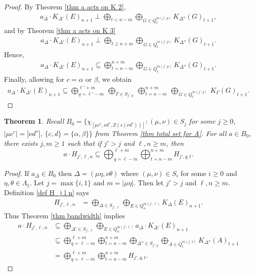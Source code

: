 \documentclass[12pt]{amsart}
\newcommand{\sse}{\subseteq}
\newcommand{\al}{\alpha}
\newcommand{\be}{\beta}
\newcommand{\Ga}{\Gamma}
\newcommand{\De}{\Delta}
\renewcommand{\th}{\theta}
\newcommand{\La}{\Lambda}
\theoremstyle{plain} %
\newtheorem{Theorem}{Theorem}[section]
\theoremstyle{definition} %
\begin{document}
\begin{proof}
    By Theorem \ref{thm a acts on K 2},
    \begin{align*}
        a_{\De} \cdot K_{\De'}(E)_{n+1} \perp \bigoplus_{t < n-m} \bigoplus_{G \in Q_{t}^{m(j',p)}} K_{\De''}(G)_{t+1},
    \end{align*}
    and by Theorem \ref{thm a acts on K 3}
    \begin{align*}
        a_{\De} \cdot K_{\De'}(E)_{n+1} \perp \bigoplus_{t \ge n+m} \bigoplus_{G \in Q_{t}^{m(j',p)}} K_{\De''}(G)_{t+1}.
    \end{align*}
    Hence,
    \begin{align*}
        a_{\De} \cdot K_{\De'}(E)_{n+1} \sse \bigoplus_{t = n-m}^{n+m} \bigoplus_{G \in Q_{t}^{m(j',p)}} K_{\De''}(G)_{t+1}.
    \end{align*}
    Finally, allowing for $c= \al$ or $\be$, we obtain
    \begin{align*}
        a_{\De} \cdot K_{\De'}(E)_{n+1} \sse \bigoplus_{q=\ell'-m}^{\ell'+m}\ \bigoplus_{\Ga \in S_{j',q}}\ \bigoplus_{t = n-m}^{n+m}\ \bigoplus_{G \in Q_{t}^{m(j',q)}}\ K_{\Ga}(G)_{t+1}.
    \end{align*}
\end{proof}



\begin{Theorem}\label{thm total bandwidth}
    Recall $B_0= \{\chi_{[\mu c^r, \nu d^s, Z(s(\nu d^s))]} : (\mu, \nu) \in S_j$ for some $j \ge 0$, $|\mu c^r| = |\nu d^s|, \ \{c, d\} = \{\al,\be\} \}$ from Theorem \ref{thm total set for A}. For all $a \in B_0$, there exists $j, m \ge 1$ such that if $j' > j$ and $\ell, n \ge m$, then
    \begin{equation*}
        a \cdot H_{j', \ell, n} \sse \bigoplus_{q = \ell-m}^{\ell+m} \bigoplus_{t =n-m}^{n+m} H_{j', q, t}.
    \end{equation*}
\end{Theorem}

\begin{proof}
    If $a_{\De} \in B_0$ then $\De = (\mu \eta, \nu \th)$ where $(\mu, \nu) \in S_i$ for some $i \ge 0$ and $\eta, \th \in \La_1$. Let $j = \max\{i, 1\}$ and $m = |\mu \eta|$. Then let $j' > j$ and $\ell, n \ge m$.
    Definition \ref{def H_j l n} says
    \begin{align*}
        H_{j', \ell, n} &= \bigoplus_{\De \in S_{j',\ell}} \bigoplus_{E \in Q_n^{m(j',\ell)}} K_{\De}(E)_{n+1}.
    \end{align*}
    Thus Theorem \ref{thm bandwidth} implies
    \begin{align*}
        a \cdot H_{j',\ell,n} &\sse \bigoplus_{\De' \in S_{j',\ell}} \bigoplus_{E \in Q_n^{m(j',\ell)}} a_{\De} \cdot K_{\De'}(E)_{n+1}\\
        &\sse \bigoplus_{q=\ell-m}^{\ell+m} \bigoplus_{t=n-m}^{n+m} \bigoplus_{\De'' \in S_{j',q}} \bigoplus_{A \in Q_t^{m(j',t)}} K_{\De''}(A)_{t+1}\\
        &= \bigoplus_{q=\ell-m}^{\ell+m} \bigoplus_{t=n-m}^{n+m} H_{j', q, t}.
    \end{align*}
\end{proof}
\end{document}
